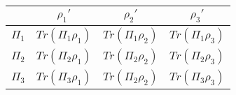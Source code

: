 \documentclass[12pt,a4paper]{article}
\begin{document}
    \begin{center}
        \begin{tabular}{|c||c c c||} 
            \hline
              & $\rho_1'$ & $\rho_2'$ & $\rho_3'$ \\ [0.5ex] 
            \hline\hline
            $\Pi_1$ & $Tr(\Pi_1 \rho_1 )$ & $Tr(\Pi_1 \rho_2 )$ & $Tr(\Pi_1 \rho_3 )$ \\ 
            \hline
            $\Pi_2$ & $Tr(\Pi_2 \rho_1 )$ & $Tr(\Pi_2 \rho_2 )$ & $Tr(\Pi_2 \rho_3 )$ \\
            \hline
            $\Pi_3$ & $Tr(\Pi_3 \rho_1 )$ & $Tr(\Pi_2 \rho_2 )$ & $Tr(\Pi_3 \rho_3 )$ \\ [1ex] 
            \hline
        \end{tabular}
    \end{center}

    








\end{document}
